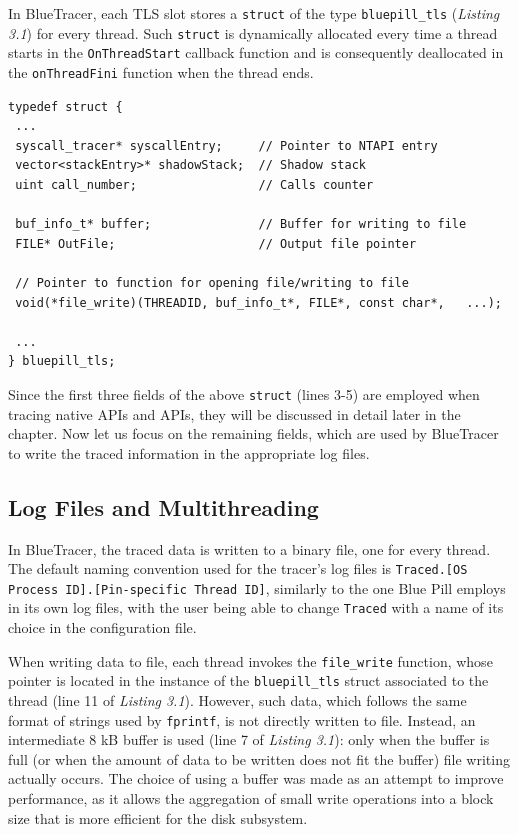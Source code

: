 In BlueTracer, each TLS slot stores a \texttt{struct} of the type \texttt{bluepill\_tls} (\textit{Listing 3.1}) for every thread. Such \texttt{struct} is dynamically allocated every time a thread starts in the \texttt{OnThreadStart} callback function and is consequently deallocated in the \texttt{onThreadFini} function when the thread ends.

\vspace{0.5cm}
\begin{lstlisting}[caption={Thread Local Data},captionpos=b]
typedef struct {
 ...
 syscall_tracer* syscallEntry;     // Pointer to NTAPI entry
 vector<stackEntry>* shadowStack;  // Shadow stack
 uint call_number;             	   // Calls counter							
 
 buf_info_t* buffer;		   	   // Buffer for writing to file				 
 FILE* OutFile;                    // Output file pointer
 
 // Pointer to function for opening file/writing to file	
 void(*file_write)(THREADID, buf_info_t*, FILE*, const char*, 	...);
 
 ...
} bluepill_tls;
\end{lstlisting}

Since the first three fields of the above \texttt{struct} (lines 3-5) are employed when tracing native APIs and APIs, they will be discussed in detail later in the chapter. Now let us focus on the remaining fields, which are used by BlueTracer to write the traced information in the appropriate log files. 

\subsection{Log Files and Multithreading}

In BlueTracer, the traced data is written to a binary file, one for every thread. The default naming convention used for the tracer's log files is \texttt{Traced.[OS Process ID].[Pin-specific Thread ID]}, similarly to the one Blue Pill employs in its own log files, with the user being able to change \texttt{Traced} with a name of its choice in the configuration file. 

When writing data to file, each thread invokes the \texttt{file\_write} function, whose pointer is located in the instance of the \texttt{bluepill\_tls} struct associated to the thread (line 11 of \textit{Listing 3.1}). However, such data, which follows the same format of strings used by \texttt{fprintf}, is not directly written to file. Instead, an intermediate 8 kB buffer is used (line 7 of \textit{Listing 3.1}): only when the buffer is full (or when the amount of data to be written does not fit the buffer) file writing actually occurs. The choice of using a buffer was made as an attempt to improve performance, as it allows the aggregation of small write operations into a block size that is more efficient for the disk subsystem.

